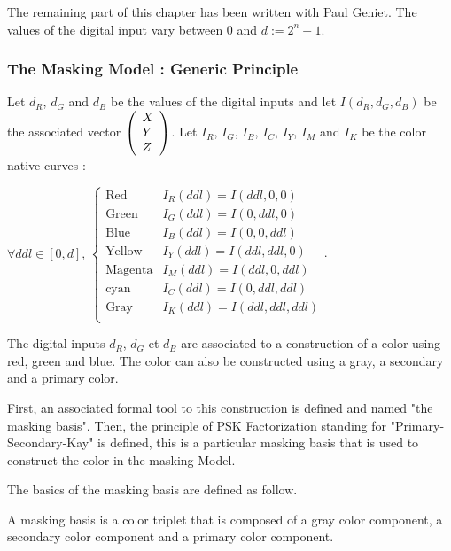 The remaining part of this chapter has been written with Paul Geniet. The values of the digital input vary between $0$ and $d:=2^{n}-1$.\par

\subsubsection{The Masking Model : Generic Principle}
Let $d_{R}$, $d_{G}$ and $d_{B}$ be the values of the digital inputs and let $I\left(d_{R},d_{G},d_{B}\right)$ be the associated vector $\left(\begin{array}{l} X\\ Y\\ Z\\ \end{array}\right)$.
Let $I_{R}$, $I_{G}$, $I_{B}$, $I_{C}$, $I_{Y}$, $I_{M}$ and $I_{K}$ be the color native curves : \par
$
\forall ddl\in\left[0,d\right]\text{, }\left\{
\begin{array}{ll}
\text{Red}&I_{R}\left(ddl\right)=I\left(ddl,0,0\right)\\
\text{Green}&I_{G}\left(ddl\right)=I\left(0,ddl,0\right)\\
\text{Blue}&I_{B}\left(ddl\right)=I\left(0,0,ddl\right)\\
\text{Yellow}&I_{Y}\left(ddl\right)=I\left(ddl,ddl,0\right)\\
\text{Magenta}&I_{M}\left(ddl\right)=I\left(ddl,0,ddl\right)\\
\text{cyan}&I_{C}\left(ddl\right)=I\left(0,ddl,ddl\right)\\
\text{Gray}&I_{K}\left(ddl\right)=I\left(ddl,ddl,ddl\right)\\
\end{array}
\right.
$.\par

The digital inputs $d_{R}$, $d_{G}$ et $d_{B}$ are associated to a construction of a color using red, green and blue. 
The color can also be constructed using a gray, a secondary and a primary color.\par


First, an associated formal tool  to this construction is defined and named "the masking basis". 
Then, the principle of PSK Factorization standing for "Primary-Secondary-Kay" is defined, this is a particular masking basis that is used to construct the color in the masking Model. 

The basics of the masking basis are defined as follow.
\begin{defi}
A masking basis is a color triplet that is composed of a gray color component, a secondary color component and a primary color component.
\label{defimaskbasis}
\end{defi}

